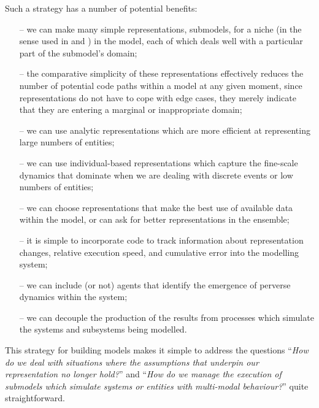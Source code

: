 Such a strategy has a number of potential benefits:
\begin{itemize}
\item[--] we can make many simple representations, submodels, for a niche
        (in the sense used in \cite{gray2006nws} and \cite{gray2014}) in the
        model, each of which deals well with a particular part of the
        submodel's domain;
\item[--] the comparative simplicity of these representations effectively 
      reduces the number of potential code paths within a model at any
      given moment, since representations do not have to cope with
      edge cases, they merely indicate that they are entering a marginal
      or inappropriate domain;
\item[--] we can use analytic representations which are more efficient at
      representing large numbers of entities;
\item[--] we can use individual-based representations which capture
      the fine-scale dynamics that dominate when we are dealing with
      discrete events or low numbers of entities;
\item[--] we can choose representations that make the best use of available
      data within the model, or can ask for better representations
      in the ensemble;
\item[--] it is simple to incorporate code to track information about
      representation changes, relative execution speed, and cumulative
      error into the modelling system;
\item[--] we can include (or not) agents that identify the emergence of 
      perverse dynamics within the system;

\item[--] we can decouple the production of the results from processes
      which simulate the systems and subsystems being modelled.
\end{itemize}

This strategy for building models makes it simple to address the
questions ``\emph{How do we deal with situations 
where the assumptions that underpin our representation no longer hold?}'' 
and ``\emph{How do we manage the execution of submodels which simulate
systems or entities with multi-modal behaviour?}'' quite straightforward.

